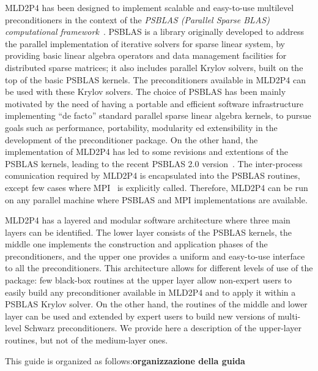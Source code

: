 MLD2P4 has been designed to implement scalable and easy-to-use multilevel preconditioners
in the context of the \emph{PSBLAS (Parallel Sparse BLAS) computational framework}~\cite{psblas_00}.
PSBLAS is a library originally developed to address the parallel implementation of
iterative solvers for sparse linear system, by providing basic linear algebra
operators and data management facilities for distributed sparse matrices; it
also includes parallel Krylov solvers, built on the top of the basic PSBLAS kernels.
The preconditioners available in MLD2P4 can be used with these Krylov solvers.
The choice of PSBLAS has been mainly motivated by the need of having
a portable and efficient software infrastructure implementing ``de facto'' standard
parallel sparse linear algebra kernels, to pursue goals such as performance,
portability, modularity ed extensibility in the development of the preconditioner
package. On the other hand, the implementation of MLD2P4 has led to some
revisions and extentions of the PSBLAS kernels, leading to the
recent PSBLAS 2.0 version~\cite{PSBLASGUIDE}. The inter-process comunication required
by MLD2P4 is encapsulated into the PSBLAS routines, except few cases where
MPI~\cite{MPI1} is explicitly called. Therefore, MLD2P4 can be run on any parallel
machine where PSBLAS and MPI implementations are available.

MLD2P4 has a layered and modular software architecture where three main layers can be identified. 
The lower layer consists of the PSBLAS kernels, the middle one implements
the construction and application phases of the preconditioners, and the upper one
provides a uniform and easy-to-use interface to all the preconditioners. 
This architecture allows for different levels of use of the package:
few black-box routines at the upper layer allow non-expert users to easily
build any preconditioner available in MLD2P4 and to apply it within a PSBLAS Krylov solver.
On the other hand, the routines of the middle and lower layer can be used and extended
by expert users to build new versions of multi-level Schwarz preconditioners.
We provide here a description of the upper-layer routines, but not of the
medium-layer ones.

This guide is organized as follows:\textbf{organizzazione della guida}

